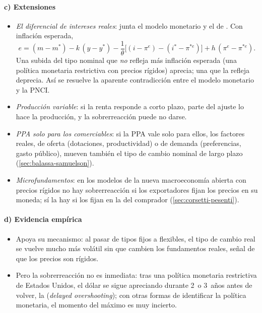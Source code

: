 \documentclass[11pt]{article}
\begin{document}
\paragraph{c) Extensiones}
\begin{itemize}
\item \emph{El diferencial de intereses reales}: \textcite{Frankel1979Mark} junta el modelo monetario y el de . Con inflación esperada,
  \begin{equation}\label{eq:frankel}
  e=(m-m^*)-k\,(y-y^*)-\frac{1}{\theta}\big[(i-\pi^e)-(i^*-\pi^{*e})\big]+h\,(\pi^e-\pi^{*e}) .
  \end{equation}
  Una subida del tipo nominal que \emph{no} refleja más inflación esperada (una política monetaria restrictiva con precios rígidos) aprecia; una que la refleja deprecia. Así se resuelve la aparente contradicción entre el modelo monetario y la PNCI.
\item \emph{Producción variable}: si la renta responde a corto plazo, parte del ajuste lo hace la producción, y la sobrerreacción puede no darse\nocite{Dornbusch1976Expectations}.
\item \emph{PPA solo para los comerciables}: si la PPA vale solo para ellos, los factores reales, de oferta (dotaciones, productividad) o de demanda (preferencias, gasto público), mueven también el tipo de cambio nominal de largo plazo (\ref{sec:balassa-samuelson}).
\item \emph{Microfundamentos}: en los modelos de la nueva macroeconomía abierta con precios rígidos\nocite{ObstfeldRogoff1995Redux} no hay sobrerreacción si los exportadores fijan los precios en su moneda; sí la hay si los fijan en la del comprador\nocite{BettsDevereux2000} (\ref{sec:corsetti-pesenti}).
\end{itemize}

\paragraph{d) Evidencia empírica}
\begin{itemize}
\item Apoya su mecanismo: al pasar de tipos fijos a flexibles, el tipo de cambio real se vuelve mucho más volátil sin que cambien los fundamentos reales, señal de que los precios son rígidos\nocite{Mussa1986Nominal}.
\item Pero la sobrerreacción no es inmediata: tras una política monetaria restrictiva de Estados Unidos, el dólar se sigue apreciando durante 2~o 3~años antes de volver, la  (\emph{delayed overshooting})\nocite{EichenbaumEvans1995}; con otras formas de identificar la política monetaria, el momento del máximo es muy incierto\nocite{FaustRogers2003Monetary}.
\end{itemize}
\end{document}
